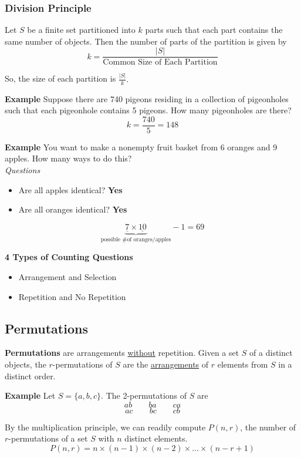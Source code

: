 \documentclass[12pt]{article}
\begin{document}
\subsubsection{Division Principle}
Let $S$ be a finite set partitioned into $k$ parts such that each part contains the same number of objects. Then the number of parts of the partition is given by 
$$k = \frac{|S|}{\text{Common Size of Each Partition}}$$

So, the size of each partition is $\frac{|S|}{k}.$

\vspace{1.5\baselineskip}
{\bf Example} Suppose there are 740 pigeons residing in a collection of pigeonholes such that each pigeonhole contains 5 pigeons. How many pigeonholes are there?
$$k = \frac{740}{5} = 148$$

\newpage
{\bf Example} You want to make a nonempty fruit basket from 6 oranges and 9 apples. How many ways to do this?\\

{\sl Questions}
\begin{itemize}
    \item Are all apples identical? {\bf Yes}
    \item Are all oranges identical? {\bf Yes}
\end{itemize}
$$\underbrace{\underline{7}\times \underline{10}}_{\text{possible \# of oranges/apples}} - 1 =69$$

\vspace{1.5\baselineskip}
{\bf 4 Types of Counting Questions}
\begin{itemize}
    \item Arrangement and Selection
    \item Repetition and No Repetition
\end{itemize}

\subsection{Permutations}
{\bf Permutations} are arrangements \underline{without} repetition. Given a set $S$ of a distinct objects, the $r$-permutations of $S$ are the \underline{arrangements} of $r$ elements from $S$ in a distinct order.

\vspace{1.5\baselineskip}
{\bf Example} Let $S=\{a,b,c\}$. The 2-permutations of $S$ are
$$ab\qquad ba\qquad ca $$
$$ac\qquad bc\qquad cb $$

By the multiplication principle, we can readily compute $P(n,r)$, the number of $r$-permutations of a set $S$ with $n$ distinct elements.
$$P(n,r) = n\times (n-1) \times (n-2) \times \ldots \times (n-r+1)$$
\end{document}
